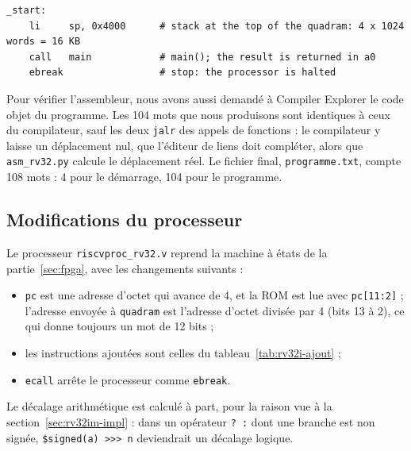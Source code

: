 \noindent\begin{minipage}{\linewidth}
\begin{lstlisting}[style=code, caption={Code de démarrage \texttt{crt0.s}}, label={lst:crt0}]
_start:
    li     sp, 0x4000      # stack at the top of the quadram: 4 x 1024 words = 16 KB
    call   main            # main(); the result is returned in a0
    ebreak                 # stop: the processor is halted
\end{lstlisting}
\end{minipage}\par

Pour vérifier l'assembleur, nous avons aussi demandé à Compiler Explorer le code objet du
programme. Les 104 mots que nous produisons sont identiques à ceux du compilateur, sauf
les deux \texttt{jalr} des appels de fonctions : le compilateur y laisse un déplacement nul,
que l'éditeur de liens doit compléter, alors que \texttt{asm\_rv32.py} calcule le
déplacement réel. Le fichier final, \texttt{programme.txt}, compte 108 mots : 4 pour le
démarrage, 104 pour le programme.

\subsection{Modifications du processeur}

Le processeur \texttt{riscvproc\_rv32.v} reprend la machine à états de la
partie~\ref{sec:fpga}, avec les changements suivants :
\begin{itemize}
\item \texttt{pc} est une adresse d'octet qui avance de 4, et la ROM est lue avec
\texttt{pc[11:2]} ; l'adresse envoyée à \texttt{quadram} est l'adresse d'octet divisée par 4
(bits 13 à 2), ce qui donne toujours un mot de 12 bits ;
\item les instructions ajoutées sont celles du tableau~\ref{tab:rv32i-ajout} ;
\item \texttt{ecall} arrête le processeur comme \texttt{ebreak}.
\end{itemize}
Le décalage arithmétique est calculé à part, pour la raison vue à la
section~\ref{sec:rv32im-impl} : dans un opérateur \texttt{? :} dont une branche est non signée,
\lstinline[style=vlinline]|$signed(a) >>> n| deviendrait un décalage logique.

